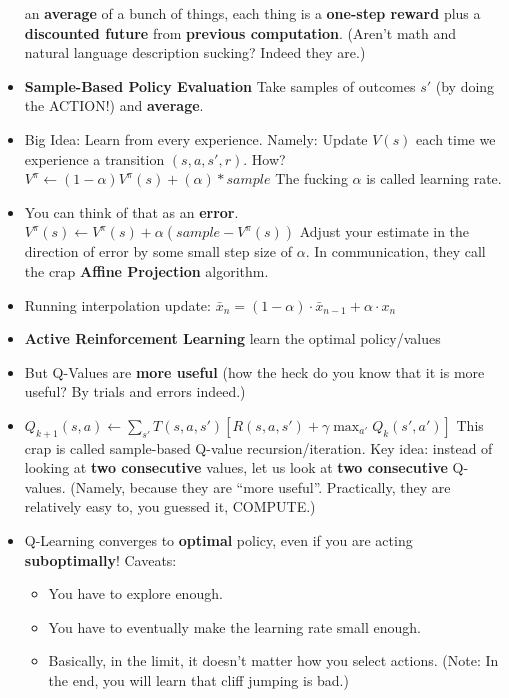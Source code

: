 \documentclass[twocolumn]{article}
\begin{document}
\begin{itemize}
  an \textbf{average} of a bunch of things, each thing is a
  \textbf{one-step reward} plus a \textbf{discounted future} from
  \textbf{previous computation}. (Aren't math and natural language
  description sucking? Indeed they are.)
\item \textbf{Sample-Based Policy Evaluation} Take samples of outcomes
  $s'$ (by doing the ACTION!) and \textbf{average}.
\item Big Idea: Learn from every experience. Namely: Update $V(s)$
  each time we experience a transition $(s,a,s',r)$. How?
  $V^{\pi}\leftarrow (1-\alpha)V^{\pi}(s)+(\alpha)*sample$ The fucking
  $\alpha$ is called learning rate.
\item You can think of that as an
  \textbf{error}. $V^{\pi}(s)\leftarrow V^{\pi}(s)+\alpha (sample -
  V^{\pi}(s))$ Adjust your estimate in  the direction of error by some
  small step size of $\alpha$. In communication, they call the crap
  \textbf{Affine Projection} algorithm.
\item Running interpolation update: $\bar{x}_{n}=(1-\alpha)\cdot
  \bar{x}_{n-1}+\alpha\cdot x_{n}$
\item \textbf{Active Reinforcement Learning} {\color{red} learn the
    optimal policy/values}
\item But Q-Values are \textbf{more useful} (how the heck do you know
  that it is more useful? By trials and errors indeed.)
\item
  $Q_{k+1}(s,a)\leftarrow\sum_{s'}T(s,a,s')[R(s,a,s')+\gamma\displaystyle{\max_{a'}}Q_{k}(s',a')]$
  This crap is called sample-based Q-value recursion/iteration. Key
  idea: instead of looking at \textbf{two consecutive} {\color{red}
    values}, let us look at \textbf{two consecutive}
  Q-values. (Namely, because they are ``more useful''. Practically,
  they are relatively easy to, you guessed it, COMPUTE.)
\item Q-Learning converges to \textbf{optimal} policy, even if you are
  acting \textbf{suboptimally}! Caveats:
  \begin{itemize}
  \item You have to explore enough.
  \item You have to eventually make the learning rate small enough.
  \item Basically, in the limit, it doesn't matter how you select
    actions. (Note: In the end, you will learn that cliff jumping is
    bad.)
  \end{itemize}
\end{itemize}
\end{document}
